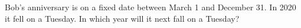 Bob's anniversary is on a fixed date between March 1 and December 31. In 2020 it fell on a Tuesday. In which year will it next fall on a Tuesday?
